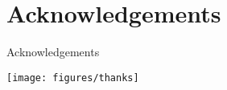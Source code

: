 \section*{Acknowledgements}
\begin{frame}{Acknowledgements}
\begin{center}
\texttt{[image: figures/thanks]}
\end{center}
\end{frame}
